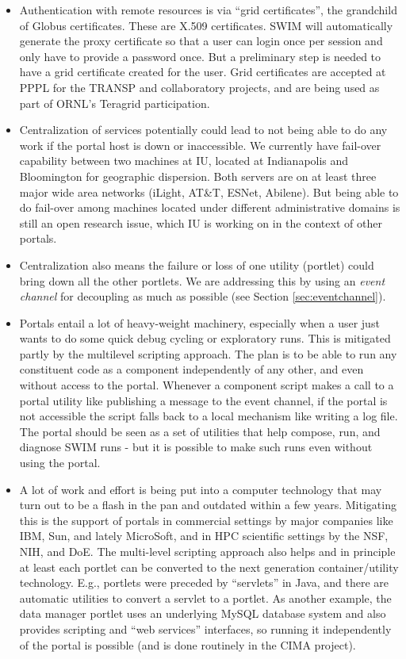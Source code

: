 \begin{itemize}
  \item Authentication with remote resources is via ``grid certificates'', the
  grandchild of Globus certificates. These are X.509 certificates. SWIM will
  automatically generate the proxy certificate so that a user can login once
  per session and only have to provide a password once. But a preliminary step
  is needed to have a grid certificate created for the user.  Grid certificates
  are accepted at PPPL for the TRANSP and collaboratory projects, and are being
  used as part of ORNL's Teragrid participation.
  \item Centralization of services potentially could lead to not being able to
  do any work if the portal host is down or inaccessible. We currently have 
  fail-over capability between two machines at IU, located at Indianapolis and
  Bloomington for geographic dispersion. Both servers are on at least three
  major wide area networks (iLight, AT\&T, ESNet, Abilene). But being able to
  do fail-over among machines located under different administrative domains
  is still an open research issue, which IU is working on in the context of
  other portals. 
  \item Centralization also means the failure or loss of one utility (portlet)
    could bring down all the other portlets. We are addressing this by using
    an {\em event channel} for decoupling as much as possible (see Section
            \ref{sec:eventchannel}).
  \item Portals entail a lot of heavy-weight machinery, especially when a user
  just wants to do some
  quick debug cycling or exploratory runs. This is  mitigated partly by the
  multilevel scripting approach. The plan is to be able to run any constituent
  code as a component independently of any other, and even without access to the
  portal. Whenever a component script makes a call to a portal utility like 
  publishing a message to the event channel, if the portal is not accessible
  the script falls back to a local mechanism like writing a log file.
  The portal should be seen as a set of utilities that help compose, run,
  and diagnose SWIM runs - but it is possible to make such runs even without
  using the portal.
  \item A lot of work and effort is being put into a computer technology that
  may turn out to be a flash in the pan and outdated within a few years.
  Mitigating this is the support of portals in commercial settings by major
  companies like IBM, Sun, and lately MicroSoft, and in HPC scientific settings
  by the NSF, NIH, and DoE. The multi-level scripting approach also helps and in
  principle at least each portlet can be converted to the next generation
  container/utility technology. E.g., portlets were preceded by ``servlets'' in Java,
  and there are automatic utilities to convert a servlet to a portlet. 
  As another example,
  the data manager portlet uses an underlying MySQL database system and also
  provides scripting and ``web services'' interfaces, so running it independently
  of the portal is possible (and is done routinely in the CIMA project).
\end{itemize}
